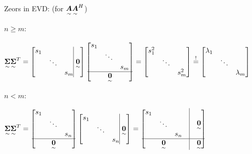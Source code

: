 \ \\

Zeors in EVD: (for $\underset{\sim}{\boldsymbol {A}}\underset{\sim}{\boldsymbol {A}}^H$)


 $n\geq m$:

$\ma{\Sigma}\ma{\Sigma}^T=
\begin{bmatrix}\begin{matrix}s_1 & & \\ &\ddots& \\ & & s_m  \end{matrix}\vline \;\ma{0} \end{bmatrix}
\begin{bmatrix}\begin{matrix}s_1 & & \\ &\ddots& \\ & & s_m  \end{matrix}\\\hline\ma{0} \end{bmatrix}  
=\begin{bmatrix}s_1^2 & & \\ &\ddots& \\ & & s_m^2  \end{bmatrix}\overset{!}{=}
\begin{bmatrix}\lambda_1 & & \\ &\ddots& \\ & & \lambda_m  \end{bmatrix}$

 $n< m$:

$\ma{\Sigma}\ma{\Sigma}^T=
\begin{bmatrix}\begin{matrix}s_1 & & \\ &\ddots& \\ & & s_n  \end{matrix}\\\hline\ma{0} \end{bmatrix}
\begin{bmatrix}\begin{matrix}s_1 & & \\ &\ddots& \\ & & s_n  \end{matrix}\vline \;\ma{0} \end{bmatrix}
=\begin{bmatrix}\begin{matrix}s_1 & & \\ &\ddots& \\ & & s_n  \end{matrix}&\vline&\ma{0}\\ \hline \ma{0}&\vline&\ma{0} \end{bmatrix}$


